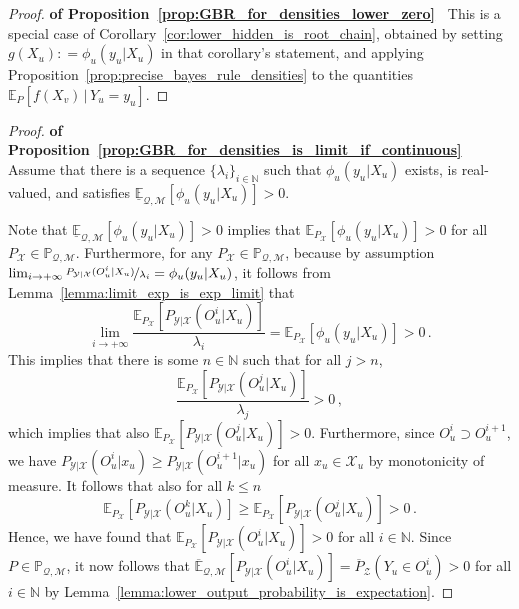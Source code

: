 \documentclass[twoside,11pt]{article}
\newcommand{\nats}{\mathbb{N}}
\newcommand{\states}{\mathcal{X}}
\newcommand{\observs}{\mathcal{Y}}
\newcommand{\lexp}{\underline{\mathbb{E}}_{\rateset,\mathcal{M}}}
\newcommand{\uexp}{\overline{\mathbb{E}}_{\rateset,\mathcal{M}}}
\newcommand{\rateset}{\mathcal{Q}}
\newcommand{\coloneqq}{:\!=}
\begin{document}
\begin{proof}{\bf of Proposition~\ref{prop:GBR_for_densities_lower_zero}~}
This is a special case of Corollary~\ref{cor:lower_hidden_is_root_chain}, obtained by setting $g(X_u)\coloneqq \phi_u(y_u\vert X_u)$ in that corollary's statement, and applying Proposition~\ref{prop:precise_bayes_rule_densities} to the quantities $\mathbb{E}_P[f(X_v)\,\vert\,Y_u=y_u]$.
\end{proof}


\begin{proof}{\bf of Proposition~\ref{prop:GBR_for_densities_is_limit_if_continuous}~}
Assume that there is a sequence $\{\lambda_i\}_{i\in\nats}$ such that $\phi_u(y_u\vert X_u)$ exists, is real-valued, and satisfies $\lexp[\phi_u(y_u\vert X_u)] >0$. 

Note that $\lexp[\phi_u(y_u\vert X_u)] >0$ implies that $\mathbb{E}_{P_\states}[\phi_u(y_u\vert X_u)]>0$ for all $P_\states\in\mathbb{P}_{\rateset,\mathcal{M}}$. Furthermore, for any $P_\states\in\mathbb{P}_{\rateset,\mathcal{M}}$, because by assumption $\lim_{i\to+\infty}\nicefrac{P_{\observs\vert\states}(O_u^i\vert X_u)}{\lambda_i}=\phi_u(y_u\vert X_u)$, it follows from Lemma~\ref{lemma:limit_exp_is_exp_limit} that
\begin{equation*}
\lim_{i\to+\infty}\frac{\mathbb{E}_{P_\states}[P_{\observs\vert\states}(O_u^i\vert X_u)]}{\lambda_i} = \mathbb{E}_{P_\states}[\phi_u(y_u\vert X_u)] > 0\,.
\end{equation*}
This implies that there is some $n\in\nats$ such that for all $j>n$,
\begin{equation*}
\frac{\mathbb{E}_{P_\states}[P_{\observs\vert\states}(O_u^j\vert X_u)]}{\lambda_j} > 0\,,
\end{equation*}
which implies that also $\mathbb{E}_{P_\states}[P_{\observs\vert\states}(O_u^j\vert X_u)] >0$. Furthermore, since $O_u^i\supset O_u^{i+1}$, we have $P_{\observs\vert\states}(O_u^i\vert x_u)\geq P_{\observs\vert\states}(O_u^{i+1}\vert x_u)$ for all $x_u\in\states_u$ by monotonicity of measure. It follows that also for all $k\leq n$
\begin{equation*}
\mathbb{E}_{P_\states}[P_{\observs\vert\states}(O_u^k\vert X_u)] \geq \mathbb{E}_{P_\states}[P_{\observs\vert\states}(O_u^j\vert X_u)] > 0\,.
\end{equation*}
Hence, we have found that $\mathbb{E}_{P_\states}[P_{\observs\vert\states}(O_u^i\vert X_u)]>0$ for all $i\in\nats$. Since $P\in\mathbb{P}_{\rateset,\mathcal{M}}$, it now follows that $\uexp[P_{\observs\vert\states}(O_u^i\vert X_u)]=\overline{P}_{\mathcal{Z}}(Y_u\in O_u^i)>0$ for all $i\in\nats$ by Lemma~\ref{lemma:lower_output_probability_is_expectation}.


\end{proof}
\end{document}
